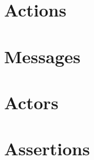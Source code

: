 \section{Actions}\label{sec:metamodel-actions}


\section{Messages}\label{sec:metamodel-messages}


\section{Actors}\label{sec:metamodel-actors}


\section{Assertions}\label{sec:seq-metamodel-assertions}


